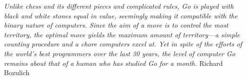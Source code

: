 \singlespace
\begin{center}
\begin{minipage}{4in}
{\em Unlike chess and its different pieces and complicated rules, Go is
played with black and white stones equal in value, seemingly making it
compatible with the binary nature of computers. Since the aim of a move is to
control the most territory, the optimal move yields the maximum amount of
territory---a simple counting procedure and a chore computers excel at. Yet
in spite of the efforts of the world's best programmers over the last 30
years, the level of computer Go remains about that of a human who has studied
Go for a month.}
\flushright
Richard Bozulich
\end{minipage}      
\end{center}
